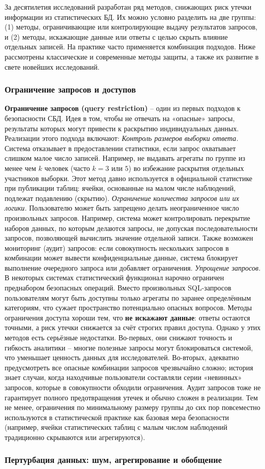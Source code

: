 За десятилетия исследований разработан ряд методов, снижающих риск утечки информации из статистических БД. Их можно условно разделить на две группы: (1) методы, ограничивающие или контролирующие выдачу результатов запросов, и (2) методы, искажающие данные или ответы с целью скрыть влияние отдельных записей. На практике часто применяется комбинация подходов. Ниже рассмотрены классические и современные методы защиты, а также их развитие в свете новейших исследований. \subsubsection{Ограничение запросов и доступов}
\textbf{Ограничение запросов (query restriction)} – один из первых подходов к безопасности СБД. Идея в том, чтобы не отвечать на «опасные» запросы, результаты которых могут привести к раскрытию индивидуальных данных. Реализации этого подхода включают:
\textit{Контроль размеров выборки ответа.} Система отказывает в предоставлении статистики, если запрос охватывает слишком малое число записей. Например, не выдавать агрегаты по группе из менее чем $k$ человек (часто $k=3$ или $5$) во избежание раскрытия отдельных участников выборки. Этот метод давно используется в официальной статистике при публикации таблиц: ячейки, основанные на малом числе наблюдений, подлежат подавлению (скрытию).
\textit{Ограничение количества запросов или их логики.} Пользователю может быть запрещено делать неограниченное число произвольных запросов. Например, система может контролировать перекрытие наборов данных, по которым делаются запросы, не допуская последовательности запросов, позволяющей вычислить значение отдельной записи. Также возможен мониторинг (аудит) запросов: если совокупность нескольких запросов в комбинации может вывести конфиденциальные данные, система блокирует выполнение очередного запроса или добавляет ограничения.
\textit{Упрощение запросов.} В некоторых системах статистический функционал нарочно ограничен преднабором безопасных операций. Вместо произвольных SQL-запросов пользователям могут быть доступны только агрегаты по заранее определённым категориям, что сужает пространство потенциально опасных вопросов.
Методы ограничения доступа хороши тем, что \textbf{не искажают данные}: ответы остаются точными, а риск утечки снижается за счёт строгих правил доступа. Однако у этих методов есть серьёзные недостатки. Во-первых, они снижают точность и гибкость аналитики – многие полезные запросы могут блокироваться системой, что уменьшает ценность данных для исследователей. Во-вторых, адекватно предусмотреть все опасные комбинации запросов чрезвычайно сложно; история знает случаи, когда находчивые пользователи составляли серии «невинных» запросов, которые в совокупности обходили ограничения. Аудит запросов тоже не гарантирует полного предотвращения утечек и обычно сложен в реализации. Тем не менее, ограничения по минимальному размеру группы до сих пор повсеместно используются в статистической практике как базовая мера безопасности (например, ячейки статистических таблиц с малым числом наблюдений традиционно скрываются или агрегируются). \subsubsection{Пертурбация данных: шум, агрегирование и обобщение}
